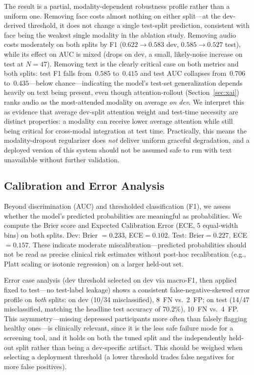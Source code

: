 \documentclass[journal]{IEEEtran}
\begin{document}
The result is a partial, modality-dependent robustness profile rather
than a uniform one. Removing face costs almost nothing on either
split---at the dev-derived threshold, it does not change a single
test-split prediction, consistent with face being the weakest single
modality in the ablation study. Removing audio costs moderately on
both splits by F1 ($0.622\to0.583$ dev, $0.585\to0.527$ test), while
its effect on AUC is mixed (drops on dev, a small, likely-noise
increase on test at $N{=}47$). Removing text is the clearly critical
case on both metrics and both splits: test F1 falls from~$0.585$
to~$0.415$ and test AUC collapses from~$0.706$ to~$0.435$---below
chance---indicating the model's test-set generalization depends
heavily on text being present, even though attention-rollout
(Section~\ref{sec:xai}) ranks audio as the most-attended modality on
average \emph{on dev}. We interpret this as evidence that average
dev-split attention weight and test-time necessity are distinct
properties: a modality can receive lower average attention while
still being critical for cross-modal integration at test time.
Practically, this means the modality-dropout regularizer does
\emph{not} deliver uniform graceful degradation, and a deployed
version of this system should not be assumed safe to run with text
unavailable without further validation.

\subsection{Calibration and Error Analysis}
\label{sec:calibration}

Beyond discrimination (AUC) and thresholded classification (F1), we
assess whether the model's predicted probabilities are meaningful as
probabilities. We compute the Brier score and Expected Calibration
Error (ECE, 5 equal-width bins) on both splits. Dev: Brier
$=0.233$, ECE$=0.102$. Test: Brier$=0.227$, ECE$=0.157$. These
indicate moderate miscalibration---predicted probabilities should not
be read as precise clinical risk estimates without post-hoc
recalibration (e.g., Platt scaling or isotonic regression) on a larger
held-out set.

Error case analysis (dev threshold selected on dev via macro-F1, then
applied fixed to test---no test-label leakage) shows a consistent
false-negative-skewed error profile on \emph{both} splits: on dev
(10/34 misclassified), 8~FN vs.\ 2~FP; on test (14/47 misclassified,
matching the headline test accuracy of $70.2\%$), 10~FN vs.\ 4~FP.
This asymmetry---missing depressed participants more often than
falsely flagging healthy ones---is clinically relevant, since it is
the less safe failure mode for a screening tool, and it holds on both
the tuned split and the independently held-out split rather than
being a dev-specific artifact. This should be weighed when selecting
a deployment threshold (a lower threshold trades false negatives for
more false positives).
\end{document}
